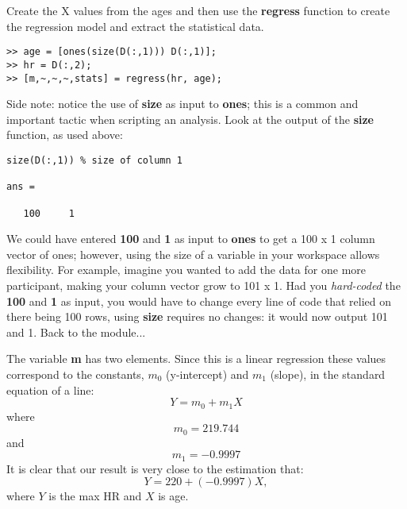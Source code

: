 \documentclass[12pt,a4paper]{article}
\begin{document}
Create the X values from the ages and then use the \textbf{regress} function to create the regression model and extract the statistical data.
\begin{lstlisting}[style=Matlab-editor]
>> age = [ones(size(D(:,1))) D(:,1)];
>> hr = D(:,2);
>> [m,~,~,~,stats] = regress(hr, age);
\end{lstlisting}
Side note: notice the use of \textbf{size} as input to \textbf{ones}; this is a common and important tactic when scripting an analysis.
Look at the output of the \textbf{size} function, as used above:
\begin{lstlisting}[style=Matlab-editor]
size(D(:,1)) % size of column 1

ans = 

   100     1
\end{lstlisting}
We could have entered \textbf{100} and \textbf{1} as input to \textbf{ones} to get a 100 x 1 column vector of ones; however, using the size of a variable in your workspace allows flexibility.
For example, imagine you wanted to add the data for one more participant, making your column vector grow to 101 x 1.
Had you \emph{hard-coded} the \textbf{100} and \textbf{1} as input, you would have to change every line of code that relied on there being 100 rows, using \textbf{size} requires no changes: it would now output 101 and 1.
Back to the module...

The variable \textbf{m} has two elements.  Since this is a linear regression these values correspond to the constants, $m_{0}$ (y-intercept) and $m_{1}$ (slope), in the standard equation of a line:
\begin{equation*}
Y = m_{0} + m_{1}X
\end{equation*}
where\\
\begin{equation*}
m_{0} = 219.744
\end{equation*}
and\\
\begin{equation*}
m_{1} = -0.9997
\end{equation*}
It is clear that our result is very close to the estimation that:
\begin{equation*}
Y = 220 +(-0.9997)X,
\end{equation*}
where $Y$ is the max HR and $X$ is age.
\end{document}
